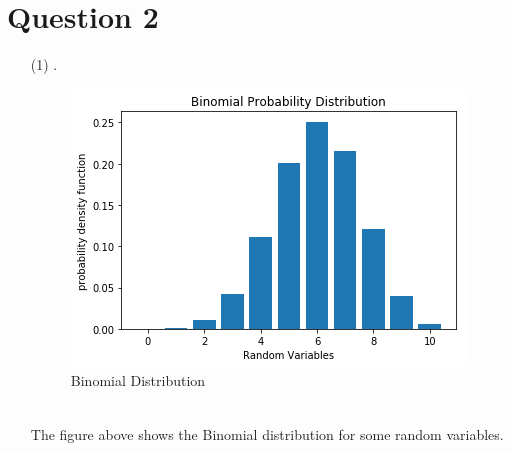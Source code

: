 \documentclass[12pt,a4paper]{article}
\begin{document}
\section*{Question 2}
\begin{itemize}
\item[(1)]
.\\
\begin{figure}[h!]
\centering
\includegraphics[scale=0.8]{Barchat.png}
\caption{Binomial Distribution}
\end{figure}
\\
The figure above shows the Binomial distribution for some random variables. 


\end{itemize}
\end{document}
